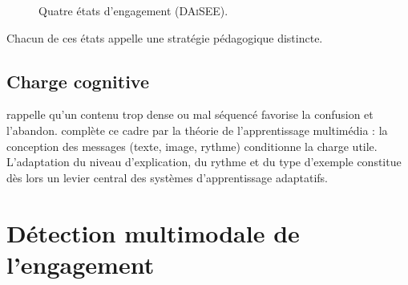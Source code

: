 \begin{figure}[H]
\centering
{}
\caption{Quatre états d'engagement (\textsc{DAiSEE}).}
\label{fig:fond-taxonomie-daisee}
\end{figure}

Chacun de ces états appelle une stratégie pédagogique distincte.

\subsection{Charge cognitive}

\textcite{sweller1988cognitive,sweller2019cognitive} rappelle qu'un
contenu trop dense ou mal séquencé favorise la confusion et l'abandon.
\textcite{mayer2021multimedia} complète ce cadre par la théorie de
l'apprentissage multimédia : la conception des messages (texte, image,
rythme) conditionne la charge utile. L'adaptation du niveau d'explication,
du rythme et du type d'exemple constitue dès lors un levier central des
systèmes d'apprentissage adaptatifs.

\section{Détection multimodale de l'engagement}
\label{sec:fond-detection}

